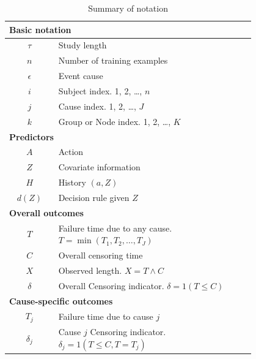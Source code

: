 \begin{longtable}{|c|p{0.8\linewidth}|}
\caption{Summary of notation} \label{tab:proj1notation} \\ %
\hline
\multicolumn{2}{|l|}{\textbf{Basic notation}} \\
\hline
    $\tau$ & Study length \\
    $n$ & Number of training examples \\
    $\epsilon$ & Event cause \\
    $i$ & Subject index. 1, 2, \dots, $n$\\
    $j$ &  Cause index. 1, 2, \dots , $J$\\
    $k$ &  Group or Node index. 1, 2, \dots , $K$\\
    \hline
    \multicolumn{2}{|l|}{\textbf{Predictors}} \\
    \hline
    $A$ & Action \\
    $Z$ & Covariate information \\
    $H$ & History $(a,Z)$\\
    $d(Z)$ & Decision rule given $Z$ \\
    \hline
    \multicolumn{2}{|l|}{\textbf{Overall outcomes}} \\
    \hline
    $T$ & Failure time due to any cause. $T = \min(T_1, T_2, \dots, T_J)$\\
    $C$ & Overall censoring time \\
    $X$ & Observed length. $X = T \wedge C$ \\
    $\delta$ & Overall Censoring indicator. $\delta = 1(T \leq C)$ \\
    \hline
    \multicolumn{2}{|l|}{\textbf{Cause-specific outcomes}} \\
    \hline
    $T_j$ & Failure time due to cause $j$ \\
    $\delta_j$ & Cause $j$ Censoring indicator. $\delta_j = 1(T \leq C, T = T_j)$ \\

\end{longtable}
